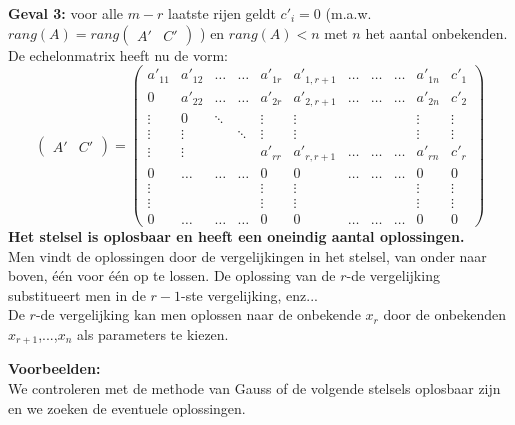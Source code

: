 \begin{framed}
	{\bf Geval 3:} voor alle $m-r$ laatste rijen geldt $c'_{i}=0$ (m.a.w. $rang(A) = rang \left( \begin{array}{c|c} A' & C' \end{array} \right)$ ) en $rang(A)<n$ met $n$ het aantal onbekenden. \\
	De echelonmatrix heeft nu de vorm:
	\[
	\left( \begin{array}{c|c} A' & C' \end{array} \right) = 
	\left(
	\begin{array}{cccccccccc|c}
	a'_{11} & a'_{12} & \ldots & \ldots & a'_{1r} & a'_{1,r+1} & \ldots & \ldots & \ldots & a'_{1n} & c'_{1} \\
	0 & a'_{22} & \ldots & \ldots & a'_{2r} & a'_{2,r+1} & \ldots & \ldots & \ldots & a'_{2n} & c'_{2} \\
	\vdots & 0 & \ddots &  & \vdots & \vdots & & & & \vdots & \vdots \\
	\vdots & \vdots & & \ddots & \vdots & \vdots & & & & \vdots & \vdots \\
	\vdots & \vdots & & & a'_{rr} & a'_{r,r+1} & \ldots & \ldots & \ldots & a'_{rn} & c'_{r} \\
	0 & \ldots & \ldots & \ldots & 0 & 0 & \ldots & \ldots & \ldots & 0 & 0 \\
	\vdots & & & & \vdots & \vdots & & & & \vdots & \vdots \\
	\vdots & & & & \vdots & \vdots & & & & \vdots & \vdots \\
	0 & \ldots & \ldots & \ldots & 0 & 0 & \ldots & \ldots & \ldots & 0 & 0 
	\end{array} \right)
	\]
	{\bf Het stelsel is oplosbaar en heeft een oneindig aantal oplossingen.} \\
	Men vindt de oplossingen door de vergelijkingen in het stelsel, van onder naar boven, \'{e}\'{e}n voor \'{e}\'{e}n op te lossen. De oplossing van de $r$-de vergelijking substitueert men in de $r-1$-ste  vergelijking, enz... \\
	De $r$-de vergelijking kan men oplossen naar de onbekende $x_{r}$ door de onbekenden $x_{r+1}$,...,$x_{n}$ als parameters te kiezen. 
\end{framed}	

{\bf Voorbeelden:}\\

We controleren met de methode van Gauss of de volgende stelsels oplosbaar zijn en we zoeken de eventuele oplossingen.

